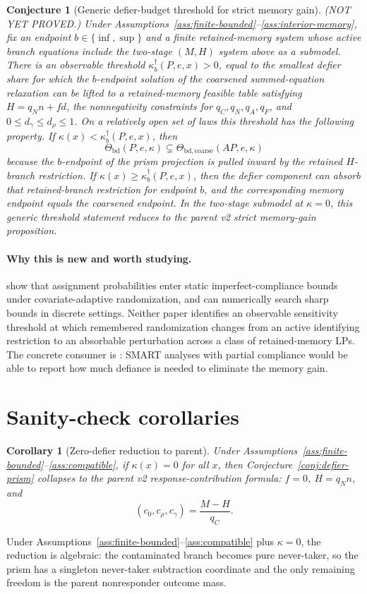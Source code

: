 \documentclass[11pt]{article}
\theoremstyle{definition}
\theoremstyle{plain}
\newtheorem{conjecture}{Conjecture}
\newtheorem{corollary}{Corollary}
\theoremstyle{remark}
\begin{document}
\begin{conjecture}[Generic defier-budget threshold for strict memory gain]\label{conj:phase-transition}
(NOT YET PROVED.)  Under Assumptions~\ref{ass:finite-bounded}--\ref{ass:interior-memory}, fix an endpoint \(b\in\{\inf,\sup\}\) and a finite retained-memory system whose active branch equations include the two-stage \((M,H)\) system above as a submodel.  There is an observable threshold \(\kappa^\dagger_b(P,e,x)>0\), equal to the smallest defier share for which the \(b\)-endpoint solution of the coarsened summed-equation relaxation can be lifted to a retained-memory feasible table satisfying \(H=q_Nn+fd\), the nonnegativity constraints for \(q_C,q_N,q_A,q_F\), and \(0\le d_\gamma\le d_\rho\le1\).  On a relatively open set of laws this threshold has the following property.  If \(\kappa(x)<\kappa^\dagger_b(P,e,x)\), then
\[
\Theta_{\mathrm{bd}}(P,e,\kappa)\subsetneq
\Theta_{\mathrm{bd,coarse}}(A P,e,\kappa)
\]
because the \(b\)-endpoint of the prism projection is pulled inward by the retained \(H\)-branch restriction.  If \(\kappa(x)\ge\kappa^\dagger_b(P,e,x)\), then the defier component can absorb that retained-branch restriction for endpoint \(b\), and the corresponding memory endpoint equals the coarsened endpoint.  In the two-stage submodel at \(\kappa=0\), this generic threshold statement reduces to the parent v2 strict memory-gain proposition.
\end{conjecture}
\paragraph{Why this is new and worth studying.}
\citet{BugniGaoObradovicVelez2024} show that assignment probabilities enter static imperfect-compliance bounds under covariate-adaptive randomization, and \citet{DuarteFinkelsteinKnoxMummoloShpitser2024} can numerically search sharp bounds in discrete settings.  Neither paper identifies an observable sensitivity threshold at which remembered randomization changes from an active identifying restriction to an absorbable perturbation across a class of retained-memory LPs.  The concrete consumer is \citet{ArtmanBhattacharyaErtefaieLynchMcKayJohnson2024}: SMART analyses with partial compliance would be able to report how much defiance is needed to eliminate the memory gain.

\section{Sanity-check corollaries}
\begin{corollary}[Zero-defier reduction to parent]\label{cor:parent}
Under Assumptions~\ref{ass:finite-bounded}--\ref{ass:compatible}, if \(\kappa(x)=0\) for all \(x\), then Conjecture~\ref{conj:defier-prism} collapses to the parent v2 response-contribution formula: \(f=0\), \(H=q_N n\), and
\[
(c_0,c_\rho,c_\gamma)=\frac{M-H}{q_C}.
\]
\end{corollary}
Under Assumptions~\ref{ass:finite-bounded}--\ref{ass:compatible} plus \(\kappa=0\), the reduction is algebraic: the contaminated branch becomes pure never-taker, so the prism has a singleton never-taker subtraction coordinate and the only remaining freedom is the parent nonresponder outcome mass.
\end{document}
